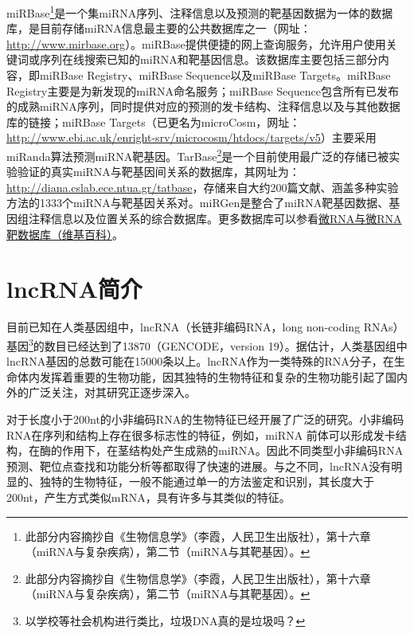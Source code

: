 \documentclass[11pt,a4paper,twoside]{book}
\begin{document}
miRBase\footnote{此部分内容摘抄自《生物信息学》（李霞，人民卫生出版社），第十六章（miRNA与复杂疾病），第二节（miRNA与其靶基因）。}是一个集miRNA序列、注释信息以及预测的靶基因数据为一体的数据库，是目前存储miRNA信息最主要的公共数据库之一（网址：\href{http://www.mirbase.org}{http://www.mirbase.org}）。miRBase提供便捷的网上查询服务，允许用户使用关键词或序列在线搜索已知的miRNA和靶基因信息。该数据库主要包括三部分内容，即miRBase Registry、miRBase Sequence以及miRBase Targets。miRBase Registry主要是为新发现的miRNA命名服务；miRBase Sequence包含所有已发布的成熟miRNA序列，同时提供对应的预测的发卡结构、注释信息以及与其他数据库的链接；miRBase Targets（已更名为microCosm，网址：\href{http://www.ebi.ac.uk/enright-srv/microcosm/htdocs/targets/v5}{http://www.ebi.ac.uk/enright-srv/microcosm/htdocs/targets/v5}）主要采用miRanda算法预测miRNA靶基因。TarBase\footnote{此部分内容摘抄自《生物信息学》（李霞，人民卫生出版社），第十六章（miRNA与复杂疾病），第二节（miRNA与其靶基因）。}是一个目前使用最广泛的存储已被实验验证的真实miRNA与靶基因间关系的数据库，其网址为：\href{http://diana.cslab.ece.ntua.gr/tatbase}{http://diana.cslab.ece.ntua.gr/tatbase}，存储来自大约200篇文献、涵盖多种实验方法的1333个miRNA与靶基因关系对。miRGen是整合了miRNA靶基因数据、基因组注释信息以及位置关系的综合数据库。更多数据库可以参看\href{http://zh.wikipedia.org/wiki/\%E5\%BE\%AERNA\%E4\%B8\%8E\%E5\%BE\%AERNA\%E9\%9D\%B6\%E6\%95\%B0\%E6\%8D\%AE\%E5\%BA\%93}{微RNA与微RNA靶数据库（维基百科）}。

\section{lncRNA简介}
目前已知在人类基因组中，lncRNA（长链非编码RNA，long non-coding RNAs）基因\footnote{以学校等社会机构进行类比，垃圾DNA真的是垃圾吗？}的数目已经达到了13870（GENCODE，version 19）。据估计，人类基因组中lncRNA基因的总数可能在15000条以上。lncRNA作为一类特殊的RNA分子，在生命体内发挥着重要的生物功能，因其独特的生物特征和复杂的生物功能引起了国内外的广泛关注，对其研究正逐步深入。

对于长度小于200nt的小非编码RNA的生物特征已经开展了广泛的研究。小非编码RNA在序列和结构上存在很多标志性的特征，例如，miRNA
前体可以形成发卡结构，在酶的作用下，在茎结构处产生成熟的miRNA。因此不同类型小非编码RNA预测、靶位点查找和功能分析等都取得了快速的进展。与之不同，lncRNA没有明显的、独特的生物特征，一般不能通过单一的方法鉴定和识别，其长度大于200nt，产生方式类似mRNA，具有许多与其类似的特征。
\end{document}
